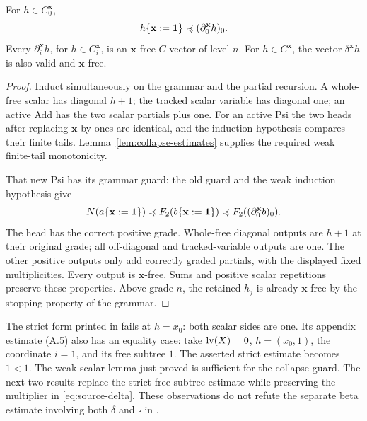 \begin{lemma}
\label{lem:weak-scalar}
For $h\in C_0^{\mathbf x}$,
\[
 h\{\mathbf x:=\mathbf1\}\preccurlyeq
             (\partial_0^{\mathbf x}h)_0.
\]
Every $\partial_i^{\mathbf x}h$, for $h\in C_i^{\mathbf x}$,
is an $\mathbf x$-free $C$-vector of level $n$.
For $h\in C^{\mathbf x}$, the vector $\delta^{\mathbf x}h$
is also valid and $\mathbf x$-free.
\end{lemma}
\begin{proof}
Induct simultaneously on the grammar and the partial recursion.
A whole-free scalar has diagonal $h+1$; the tracked scalar variable
has diagonal one; an active Add has the two scalar partials plus one.
For an active Psi the two heads after replacing $\mathbf x$ by ones
are identical, and the induction hypothesis compares their finite tails.
Lemma~\ref{lem:collapse-estimates} supplies the required weak
finite-tail monotonicity.

That new Psi has its grammar guard: the old guard and the weak
induction hypothesis give
\[
 N(a\{\mathbf x:=\mathbf1\})
 \preccurlyeq F_2(b\{\mathbf x:=\mathbf1\})
 \preccurlyeq F_2((\partial_0^{\mathbf x}b)_0).
\]
The head has the correct positive grade.  Whole-free diagonal outputs
are $h+1$ at their original grade; all off-diagonal and tracked-variable
outputs are one.  The other positive outputs only add correctly graded
partials, with the displayed fixed multiplicities.  Every output is
$\mathbf x$-free.  Sums and positive scalar repetitions preserve
these properties.  Above grade $n$, the retained $h_j$ is already
$\mathbf x$-free by the stopping property of the grammar.
\end{proof}

\begin{remark}
The strict form printed in \cite[Lemma~2.19]{ww} fails at $h=x_0$:
both scalar sides are one.  Its appendix estimate (A.5) also has an
equality case: take $\operatorname{lv}(X)=0$, $h=(x_0,1)$, the coordinate
$i=1$, and its free subtree $1$.  The asserted strict estimate becomes
$1<1$.  The weak scalar lemma just proved is sufficient for the
collapse guard.  The next two results replace the strict free-subtree
estimate while preserving the multiplier in \eqref{eq:source-delta}.
These observations do not refute the separate beta estimate involving
both $\delta$ and $\square$ in \cite[Lemma~2.22]{ww}.
\end{remark}

